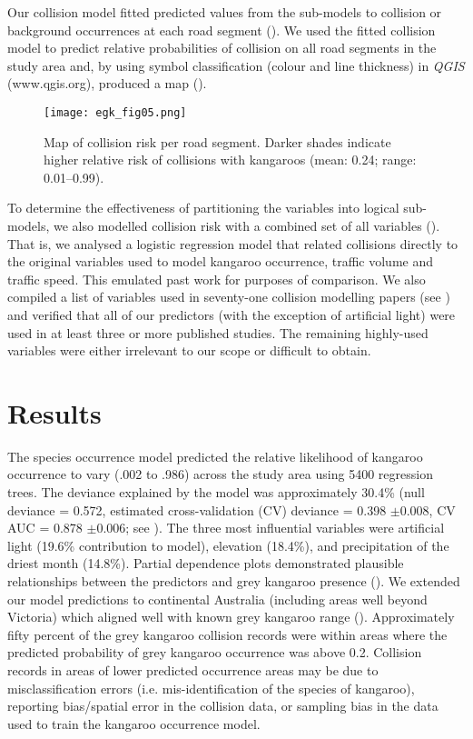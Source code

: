 Our collision model fitted predicted values from the sub-models to collision or background occurrences at each road segment (). We used the fitted collision model to predict relative probabilities of collision on all road segments in the study area and, by using symbol classification (colour and line thickness) in \textit{QGIS} (www.qgis.org), produced a map ().

\begin{figure*}[!t]
  \centering
  \texttt{[image: egk\_fig05.png]}
  \caption[Map of collision risk per road segment in Victoria]{Map of collision risk per road segment. Darker shades indicate higher relative risk of collisions with kangaroos (mean: 0.24; range: 0.01--0.99).}
  \label{egk_collmap}
\end{figure*}

To determine the effectiveness of partitioning the variables into logical sub-models, we also modelled collision risk with a combined set of all variables (). That is, we analysed a logistic regression model that related collisions directly to the original variables used to model kangaroo occurrence, traffic volume and traffic speed. This emulated past work for purposes of comparison. We also compiled a list of variables used in seventy-one collision modelling papers (see ) and verified that all of our predictors (with the exception of artificial light) were used in at least three or more published studies. The remaining highly-used variables were either irrelevant to our scope or difficult to obtain.

\section{Results}

The species occurrence model predicted the relative likelihood of kangaroo occurrence to vary (.002 to .986) across the study area using 5400 regression trees. The deviance explained by the model was approximately 30.4\% (null deviance = 0.572, estimated cross-validation (CV) deviance = 0.398 $\pm$0.008, CV AUC = 0.878 $\pm$0.006; see ). The three most influential variables were artificial light (19.6\% contribution to model), elevation (18.4\%), and precipitation of the driest month (14.8\%). Partial dependence plots demonstrated plausible relationships between the predictors and grey kangaroo presence (). We extended our model predictions to continental Australia (including areas well beyond Victoria) which aligned well with known grey kangaroo range (). Approximately fifty percent of the grey kangaroo collision records were within areas where the predicted probability of grey kangaroo occurrence was above 0.2. Collision records in areas of lower predicted occurrence areas may be due to misclassification errors (i.e. mis-identification of the species of kangaroo), reporting bias/spatial error in the collision data, or sampling bias in the data used to train the kangaroo occurrence model.

